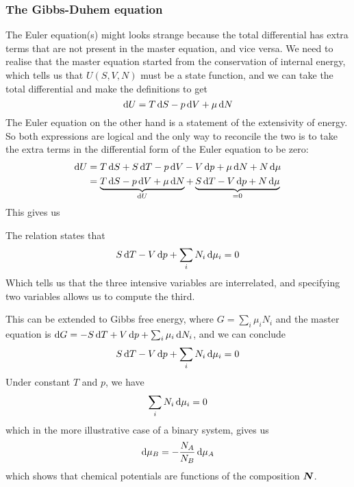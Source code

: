 \subsubsection{The Gibbs-Duhem equation}
The Euler equation(s) might looks strange because the total differential has extra terms that are not present in the master equation, and vice versa. We need to realise that the master equation started from the conservation of internal energy, which tells us that $U(S,V,N)$ must be a state function, and we can take the total differential and make the definitions to get
\begin{equation}
  \dif U=T\dif S-p\dif V+\mu\dif N
\end{equation}
The Euler equation on the other hand is a statement of the extensivity of energy. So both expressions are logical and the only way to reconcile the two is to take the extra terms in the differential form of the Euler equation to be zero:
\begin{equation}
\begin{aligned}
  \dif U&=T\dif S+S\dif T-p\dif V-V \dif p+\mu\dif N+ N\dif\mu\\
&=\underbrace{T\dif S-p\dif V+\mu\dif N}_{\dif U}+\underbrace{S\dif T-V\dif p+N\dif\mu}_{=0}
\end{aligned}
\end{equation}
This gives us
\begin{thrm}
The relation states that
\begin{equation}
  S\dif T-V\dif p+\sum_iN_i\dif\mu_i=0
\end{equation}
Which tells us that the three intensive variables are interrelated, and specifying two variables allows us to compute the third.
\end{thrm}
This can be extended to Gibbs free energy, where $G=\sum_i\mu_iN_i$ and the master equation is $\dif G=-S\dif T+V\dif p+\sum_i\mu_i\dif N_i$, and we can conclude
\begin{equation}
  S\dif T-V\dif p+\sum_iN_i\dif\mu_i=0
\end{equation}
Under constant $T$ and $p$, we have
\begin{equation}
  \sum_iN_i\dif\mu_i=0
\end{equation}
which in the more illustrative case of a binary system, gives us
\begin{equation}
  \dif\mu_B=-\frac{N_A}{N_B}\dif\mu_A
\end{equation}
which shows that chemical potentials are functions of the composition $\boldsymbol{N}$.

